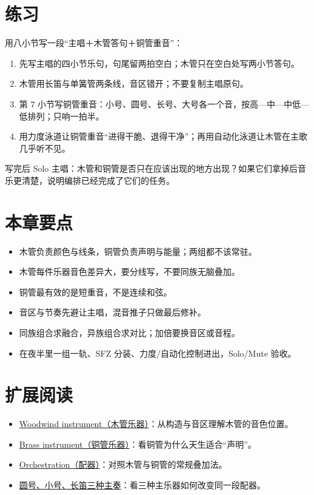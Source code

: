 \section{练习}
\label{sec:winds-exercise}

\begin{exercise}
用八小节写一段“主唱＋木管答句＋铜管重音”：
\begin{enumerate}
\item 先写主唱的四小节乐句，句尾留两拍空白；木管只在空白处写两小节答句。
\item 木管用长笛与单簧管两条线，音区错开；不要复制主唱原句。
\item 第 7 小节写铜管重音：小号、圆号、长号、大号各一个音，按高—中—中低—低排列；只响一拍半。
\item 用力度泳道让铜管重音“进得干脆、退得干净”；再用自动化泳道让木管在主歌几乎听不见。
\end{enumerate}
写完后 Solo 主唱：木管和铜管是否只在应该出现的地方出现？如果它们拿掉后音乐更清楚，说明编排已经完成了它们的任务。
\end{exercise}

\section{本章要点}
\label{sec:winds-takeaways}

\begin{itemize}
\item 木管负责颜色与线条，铜管负责声明与能量；两组都不该常驻。
\item 木管每件乐器音色差异大，要分线写，不要同族无脑叠加。
\item 铜管最有效的是短重音，不是连续和弦。
\item 音区与节奏先避让主唱，混音推子只做最后修补。
\item 同族组合求融合，异族组合求对比；加倍要换音区或音程。
\item 在夜半里一组一轨、SFZ 分装、力度/自动化控制进出，Solo/Mute 验收。
\end{itemize}

\section{扩展阅读}
\label{sec:07-winds-brass-further-reading}
\begin{itemize}
  \item \href{https://en.wikipedia.org/wiki/Woodwind_instrument}{Woodwind instrument（木管乐器）}：从构造与音区理解木管的音色位置。
  \item \href{https://en.wikipedia.org/wiki/Brass_instrument}{Brass instrument（铜管乐器）}：看铜管为什么天生适合“声明”。
  \item \href{https://en.wikipedia.org/wiki/Orchestration}{Orchestration（配器）}：对照木管与铜管的常规叠加法。
  \item \href{https://www.youtube.com/watch?v=Mf6ZKAV0ZU4}{圆号、小号、长笛三种主奏}：看三种主乐器如何改变同一段配器。
\end{itemize}

